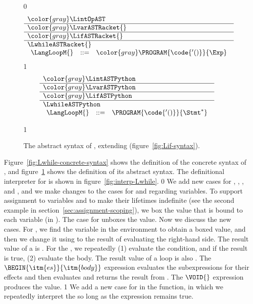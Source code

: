 \documentclass[7x10]{TimesAPriori_MIT}%
\newcommand{\gray}[1]{{\color{gray} #1}}
\def\racketEd{0}
\def\pythonEd{1}
\def\edition{1}
\newcommand{\pythonColor}[0]{}
\newcommand{\python}[1]{{\if\edition\pythonEd\pythonColor #1\fi}}
\numberwithin{theorem}{chapter}
\numberwithin{definition}{chapter}
\numberwithin{equation}{chapter}
\begin{document}
\begin{figure}[tp]
\centering
\begin{tcolorbox}[colback=white]
    \small
{\if\edition\racketEd    
\[
\begin{array}{l}
  \gray{\LintOpAST} \\ \hline
  \gray{\LvarASTRacket{}} \\ \hline
  \gray{\LifASTRacket{}} \\ \hline
  \LwhileASTRacket{} \\
\begin{array}{lcl}
  \LangLoopM{} &::=& \gray{ \PROGRAM{\code{'()}}{\Exp} }
\end{array}
\end{array}
\]
\fi}
{\if\edition\pythonEd\pythonColor
\[
\begin{array}{l}
  \gray{\LintASTPython} \\ \hline
  \gray{\LvarASTPython}  \\ \hline
  \gray{\LifASTPython} \\ \hline
  \LwhileASTPython \\
\begin{array}{lcl}
\LangLoopM{} &::=& \PROGRAM{\code{'()}}{\Stmt^{*}}
\end{array}
\end{array}
\]
\fi}
\end{tcolorbox}
\python{
  }
\caption{The abstract syntax of \LangLoop{}, extending \LangIf{} (figure~\ref{fig:Lif-syntax}).}
\label{fig:Lwhile-syntax}
\end{figure}

Figure~\ref{fig:Lwhile-concrete-syntax} shows the definition of the
concrete syntax of \LangLoop{}, and figure~\ref{fig:Lwhile-syntax}
shows the definition of its abstract syntax.
%
The definitional interpreter for \LangLoop{} is shown in
figure~\ref{fig:interp-Lwhile}.
%
{\if\edition\racketEd    
%
We add new cases for , , ,
and , and we make changes to the cases for  and
 regarding variables. To support assignment to variables and
to make their lifetimes indefinite (see the second example in
section~\ref{sec:assignment-scoping}), we box the value that is bound
to each variable (in ). The case for  unboxes the
value.
%
Now we discuss the new cases. For , we find the
variable in the environment to obtain a boxed value, and then we change
it using  to the result of evaluating the right-hand
side.  The result value of a  is .
%
For the , we repeatedly (1) evaluate the condition, and
if the result is true, (2) evaluate the body.
The result value of a  loop is also .
%
The $\BEGIN{\itm{es}}{\itm{body}}$ expression evaluates the
subexpressions  for their effects and then evaluates
and returns the result from .
%
The $\VOID{}$ expression produces the  value.
%
\fi}
{\if\edition\pythonEd\pythonColor
%
We add a new case for  in the 
function, in which we repeatedly interpret the  so long as the
 expression remains true.
%
\fi}
\end{document}
